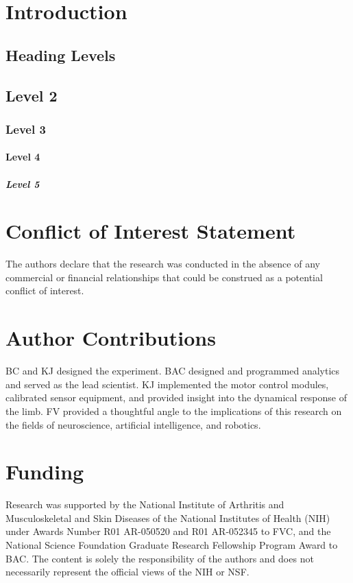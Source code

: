 \documentclass[utf8]{frontiersSCNS} %
\begin{document}
\section{Introduction}

\subsection{Heading Levels}


\subsection{Level 2}
\subsubsection{Level 3}
\paragraph{Level 4}
\subparagraph{Level 5}


\section*{Conflict of Interest Statement}
The authors declare that the research was conducted in the absence of any commercial or financial relationships that could be construed as a potential conflict of interest.

\section*{Author Contributions}
BC and KJ designed the experiment.
BAC designed and programmed analytics and served as the lead scientist.
KJ implemented the motor control modules, calibrated sensor equipment, and provided insight into the dynamical response of the limb.
FV provided a thoughtful angle to the implications of this research on the fields of neuroscience, artificial intelligence, and robotics.

\section*{Funding}
Research was supported by the National Institute of Arthritis and Musculoskeletal and Skin Diseases of
the National Institutes of Health (NIH) under Awards Number R01 AR-050520 and R01 AR-052345 to FVC, and
the National Science Foundation Graduate Research Fellowship Program Award to BAC.
The content is solely the responsibility of the authors and does not necessarily represent the official views of the NIH or NSF.
\end{document}

